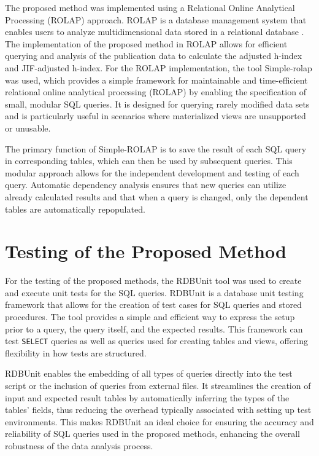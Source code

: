 The proposed method was implemented using a Relational Online Analytical
Processing (ROLAP) approach. ROLAP is a database management system that enables
users to analyze multidimensional data stored in a relational database
\cite{codd1993providing}. The implementation of the proposed method in ROLAP
allows for efficient querying and analysis of the publication data to calculate
the adjusted h-index and JIF-adjusted h-index. For the ROLAP implementation,
the tool Simple-rolap \cite{simple-rolap} was used, which provides a simple
framework for maintainable and time-efficient relational online analytical
processing (ROLAP) by enabling the specification of small, modular SQL queries.
It is designed for querying rarely modified data sets and is particularly
useful in scenarios where materialized views are unsupported or unusable.

The primary function of Simple-ROLAP is to save the result of each SQL query in
corresponding tables, which can then be used by subsequent queries. This
modular approach allows for the independent development and testing of each
query. Automatic dependency analysis ensures that new queries can utilize
already calculated results and that when a query is changed, only the dependent
tables are automatically repopulated.

\section{Testing of the Proposed Method}
For the testing of the proposed methods, the RDBUnit \cite{rdbunit} tool was
used to create and execute unit tests for the SQL queries. RDBUnit is a
database unit testing framework that allows for the creation of test cases for
SQL queries and stored procedures. The tool provides a simple and efficient way
to express the setup prior to a query, the query itself, and the expected
results. This framework can test \texttt{SELECT} queries as well as queries
used for creating tables and views, offering flexibility in how tests are
structured.

RDBUnit enables the embedding of all types of queries directly into the test
script or the inclusion of queries from external files. It streamlines the
creation of input and expected result tables by automatically inferring the
types of the tables' fields, thus reducing the overhead typically associated
with setting up test environments. This makes RDBUnit an ideal choice for
ensuring the accuracy and reliability of SQL queries used in the proposed
methods, enhancing the overall robustness of the data analysis process.

